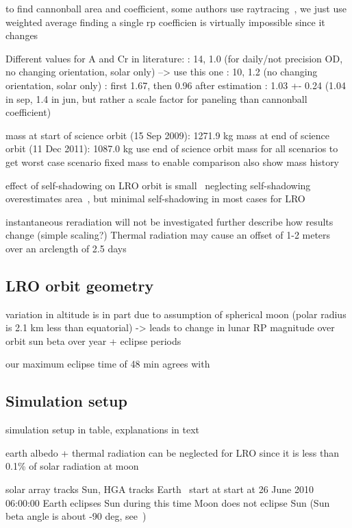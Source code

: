 to find cannonball area and coefficient, some authors use raytracing~\cite{Hattori2019}, we just use weighted average
finding a single rp coefficien is virtually impossible since it changes~\cite[p~580]{Vallado2013}

Different values for A and Cr in literature:
\cite{Nicholson2010}: 14, 1.0 (for daily/not precision OD, no changing orientation, solar only) --> use this one
\cite{Bauer2016}: 10, 1.2 (no changing orientation, solar only)
\cite{Slojkowski2015}: first 1.67, then 0.96 after estimation
\cite{Mazarico2018}: 1.03 +- 0.24 (1.04 in sep, 1.4 in jun, but rather a scale factor for paneling than cannonball coefficient)

mass at start of science orbit (15 Sep 2009): 1271.9 kg
mass at end of science orbit (11 Dec 2011): 1087.0 kg
use end of science orbit mass for all scenarios to get worst case scenario
fixed mass to enable comparison
also show mass history

effect of self-shadowing on LRO orbit is small~\cite{Loecher2018}
neglecting self-shadowing overestimates area~\cite{Mazarico2009}, but minimal self-shadowing in most cases for LRO~\cite{Slojkowski2015}

instantaneous reradiation
will not be investigated further
describe how results change (simple scaling?)
Thermal radiation may cause an offset of 1-2 meters over an arclength of 2.5 days~\cite{Bauer2016}



\subsection{LRO orbit geometry}
variation in altitude is in part due to assumption of spherical moon (polar radius is 2.1 km less than equatorial) -> leads to change in lunar RP magnitude over orbit
sun beta over year + eclipse periods

our maximum eclipse time of 48 min agrees with \cite{Tooley2010}



\subsection{Simulation setup}

simulation setup in table, explanations in text

earth albedo + thermal radiation can be neglected for LRO since it is less than 0.1\% of solar radiation at moon

solar array tracks Sun, HGA tracks Earth~\cite{Tooley2010}
start at start at 26 June 2010 06:00:00
Earth eclipses Sun during this time
Moon does not eclipse Sun (Sun beta angle is about -90 deg, see~\cite{Tooley2010})


